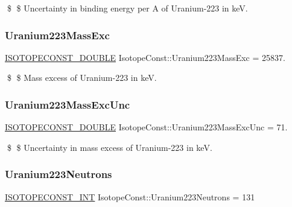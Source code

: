 \$ \$ Uncertainty in binding energy per A of Uranium-\/223 in keV. \mbox{\label{group___isotope_const-_uranium-_u223_ga9acac418d85cd118f4bc971bccd38603}} 
\subsubsection{\texorpdfstring{Uranium223\+Mass\+Exc}{Uranium223MassExc}}
{\footnotesize\ttfamily \mbox{\hyperlink{group___isotope_const-_macros_ga8f45a7272ce02c0b4c65c44636ed719a}{I\+S\+O\+T\+O\+P\+E\+C\+O\+N\+S\+T\+\_\+\+D\+O\+U\+B\+LE}} Isotope\+Const\+::\+Uranium223\+Mass\+Exc = 25837.}

\$ \$ Mass excess of Uranium-\/223 in keV. \mbox{\label{group___isotope_const-_uranium-_u223_ga2aaaa7668f010ac54a89a44bed82910b}} 
\subsubsection{\texorpdfstring{Uranium223\+Mass\+Exc\+Unc}{Uranium223MassExcUnc}}
{\footnotesize\ttfamily \mbox{\hyperlink{group___isotope_const-_macros_ga8f45a7272ce02c0b4c65c44636ed719a}{I\+S\+O\+T\+O\+P\+E\+C\+O\+N\+S\+T\+\_\+\+D\+O\+U\+B\+LE}} Isotope\+Const\+::\+Uranium223\+Mass\+Exc\+Unc = 71.}

\$ \$ Uncertainty in mass excess of Uranium-\/223 in keV. \mbox{\label{group___isotope_const-_uranium-_u223_gac98612deeb200fbc8db090d5d493dd07}} 
\subsubsection{\texorpdfstring{Uranium223\+Neutrons}{Uranium223Neutrons}}
{\footnotesize\ttfamily \mbox{\hyperlink{group___isotope_const-_macros_ga5f18360b3e99483a35c32d789e62621c}{I\+S\+O\+T\+O\+P\+E\+C\+O\+N\+S\+T\+\_\+\+I\+NT}} Isotope\+Const\+::\+Uranium223\+Neutrons = 131}


